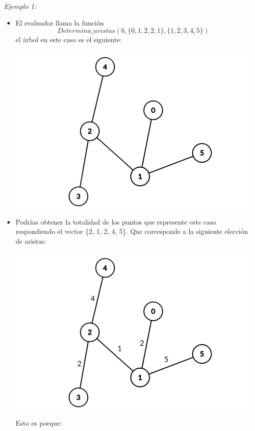 \documentclass[12pt]{scrartcl}
\begin{document}
        {\itshape Ejemplo 1:}
        \begin{itemize}
            \item El evaluador llama la función 
            $$Determina\_aristas(6, \{0, 1, 2, 2, 1\}, \{1, 2, 3, 4, 5\})$$
            el árbol en este caso es el siguiente:
            \begin{center}
                \includegraphics[scale=0.25]{ej1.png}
            \end{center}
            \item Podrías obtener la totalidad de los puntos que represente este caso respondiendo el vector \{2, 1, 2, 4, 5\}. Que corresponde a la siguiente elección de aristas:
            \begin{center}
                \includegraphics[scale=0.25]{ej2.png}
            \end{center}
            Esto es porque:
            \begin{itemize}

\end{itemize}
\end{itemize}
\end{document}
